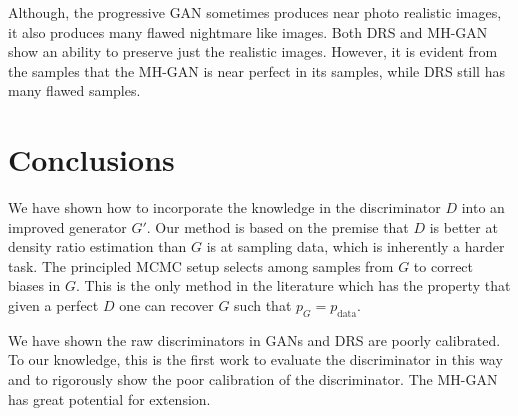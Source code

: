 \documentclass{article}
\newcommand{\PG}{{p_G}}
\newcommand{\PR}{{p_{\textrm{data}}}}
\begin{document}
Although, the progressive GAN sometimes produces near photo realistic images, it also produces many flawed nightmare like images.
Both DRS and MH-GAN show an ability to preserve just the realistic images.
However, it is evident from the samples that the MH-GAN is near perfect in its samples, while DRS still has many flawed samples.

\section{Conclusions}
\label{sec:conclusions}

We have shown how to incorporate the knowledge in the discriminator $D$ into an improved generator $G'$.
Our method is based on the premise that $D$ is better at density ratio estimation than $G$ is at sampling data, which is inherently a harder task.
The principled MCMC setup selects among samples from $G$ to correct biases in $G$.
This is the only method in the literature which has the property that given a perfect $D$ one can recover $G$ such that $\PG = \PR$.

We have shown the raw discriminators in GANs and DRS are poorly calibrated.
To our knowledge, this is the first work to evaluate the discriminator in this way and to rigorously show the poor calibration of the discriminator.
The MH-GAN has great potential for extension.

\end{document}
